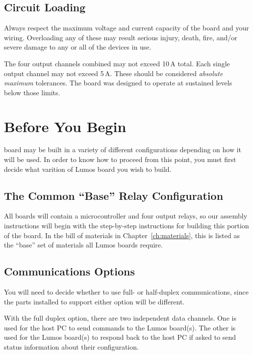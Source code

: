 \documentclass[letterpaper,twoside,onecolumn,openright,final]{memoir}
\begin{document}
\section{Circuit Loading}
Always respect the maximum voltage and current capacity of the board and your wiring.  Overloading any
of these may result serious injury, death, fire, and/or severe damage to any or all of the devices in use.

The four output channels combined may not exceed
10\,A total. 
Each single output channel
may not exceed 5\,A.  These should be considered \emph{absolute maximum} tolerances.  The board was designed
to operate at sustained levels below those limits.

\chapter{Before You Begin}\label{ch:before}
 board may be built in a variety of different configurations
depending on how it will be used.  In order to know how to proceed from this point, you must
first decide what varition of Lumos board you wish to build.

\section{The Common ``Base'' Relay Configuration}

All boards
will contain a microcontroller and four output relays, so our assembly instructions will begin with the step-by-step 
instructions for building this portion of the board.
In the bill of materials in Chapter~\ref{ch:materials}, this is listed as the ``base'' set of
materials all Lumos boards require.

\section{Communications Options}
You will need to decide whether to use full- or half-duplex  communications, since the parts installed
to support either option will be different.  

With the full duplex option, there are two independent data channels.  One is used for the host PC
to send commands to the Lumos board(s).  The other is used for the Lumos board(s) to respond back to
the host PC if asked to send status information about their configuration.
\end{document}

